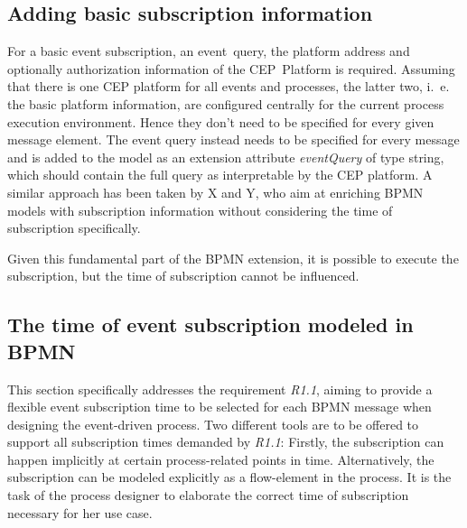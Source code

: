 \subsection{Adding basic subscription information}\label{ch:bpmnx:basic}

For a basic event subscription, an event~query, the platform address and optionally authorization information of the CEP~Platform is required. 
Assuming that there is one CEP platform for all events and processes, the latter two, i.~e. the basic platform information, are configured centrally for the current process execution environment. Hence they don't need to be specified for every given message element. 
The event query instead needs to be specified for every message and is added to the model as an extension attribute \textit{eventQuery} of type string, which should contain the full query as interpretable by the CEP platform.
A similar approach has been taken by X and Y, who aim at enriching BPMN models with subscription information without considering the time of subscription specifically.

Given this fundamental part of the BPMN extension, it is possible to execute the subscription, but the time of subscription cannot be influenced.

\subsection{The time of event subscription modeled in BPMN}\label{ch:bpmnx:subscriptiontimes}

This section specifically addresses the requirement \textit{R1.1}, aiming to provide a flexible event subscription time to be selected for each BPMN message when designing the event-driven process.
Two different tools are to be offered to support all subscription times demanded by \textit{R1.1}: Firstly, the subscription can happen implicitly at certain process-related points in time. Alternatively, the subscription can be modeled explicitly as a flow-element in the process.
It is the task of the process designer to elaborate the correct time of subscription necessary for her use case.

